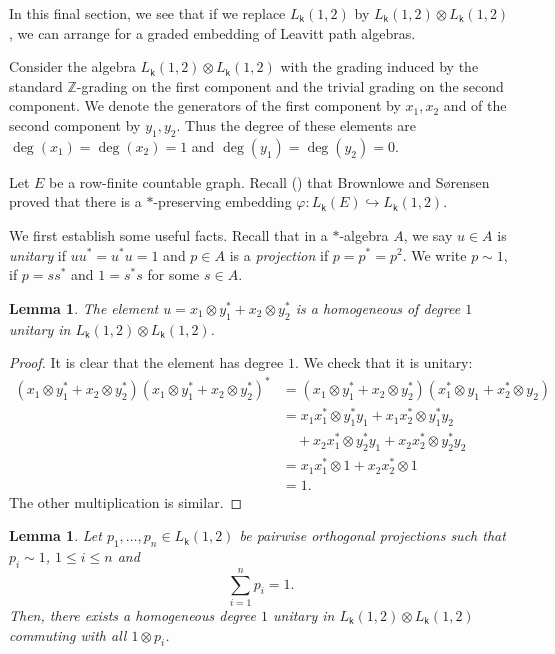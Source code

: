 \documentclass[a4paper, 11pt, reqno]{amsart}
\newtheorem{lem}[thm]{Lemma}
\theoremstyle{definition}
\newcommand{\K}{\mathsf{k}}
\begin{document}
In this final section, we see that if we replace $L_\K(1,2)$ by $L_\K(1,2)\otimes L_\K(1,2)$, we can arrange for a graded embedding of Leavitt path algebras. 

Consider the algebra $L_\K(1,2)\otimes L_\K(1,2)$ with the grading induced by the standard $\mathbb Z$-grading on the first component and the
trivial grading on the second component. We denote the generators of the first component by $x_1,x_2$ and of the second component by $y_1,y_2$. Thus the degree of these elements are $\deg(x_1)=\deg(x_2)=1$ and $\deg(y_1)=\deg(y_2)=0$.

Let $E$ be a row-finite countable graph. Recall (\cite[Theorem 4.1]{brownsor}) that Brownlowe and S{\o}rensen proved that there is a $*$-preserving
embedding
$\varphi \colon L_{\K}(E) \hookrightarrow L_\K(1,2).$

We first establish some useful facts. Recall that in a $*$-algebra $A$, we say $u\in A$ is \emph{unitary} if $uu^*=u^*u=1$ and $p\in A$ is a \emph{projection} if $p=p^*=p^2$. We write $p\sim 1$, if $p=ss^*$ and $1=s^*s$ for some $s\in A$.


\begin{lem}\label{unitary}
The element $ u = x_1 \otimes y_1^* + x_2 \otimes y_2^*$
is a homogeneous of degree $1$ unitary in $L_\K(1,2)\otimes L_\K(1,2)$.
\end{lem}

\begin{proof}
It is clear that the element has degree $1$. We check that it is unitary:
\begin{align*}
( x_1 \otimes y_1^* + x_2 \otimes y_2^* )( x_1 \otimes y_1^* + x_2 \otimes y_2^* )^*
&= ( x_1 \otimes y_1^* + x_2 \otimes y_2^* )( x_1^* \otimes y_1 +  x_2^* \otimes y_2 ) \\
&= x_1  x_1^* \otimes y_1^* y_1
 + x_1  x_2^* \otimes y_1^* y_2\\
&\quad + x_2  x_1^* \otimes y_2^* y_1
 + x_2  x_2^* \otimes y_2^* y_2 \\
&= x_1 x_1^* \otimes 1 + x_2 x_2^* \otimes 1 \\
&= 1.
\end{align*}
The other multiplication is similar.
\end{proof}

\begin{lem}\label{lem4.2}
Let $p_1,\dots,p_n \in L_\K(1,2)$ be pairwise orthogonal projections such that $p_i\sim 1$, $1\leq i\leq n$ and 
\[
\sum_{i=1}^n p_i = 1.
\]
Then, there exists a homogeneous degree $1$ unitary in $L_\K(1,2)\otimes L_\K(1,2)$ commuting with all $1 \otimes p_i$.
\end{lem}
\end{document}
